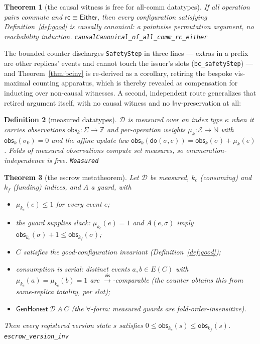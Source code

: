 \documentclass[11pt]{article}
\newtheorem{theorem}{Theorem}[section]
\newtheorem{definition}[theorem]{Definition}
\newcommand{\vis}{\xrightarrow{\mathsf{vis}}}
\newcommand{\rcrel}{\mathsf{rc}}                 %
\newcommand{\Sinit}{\sigma_0}
\newcommand{\lean}[1]{\texttt{#1}}
\newcommand{\M}[1]{\mathcal{#1}}
\newcommand{\st}{\sigma}
\newcommand{\dodo}{\mathsf{do}}
\newcommand{\Inv}{\mathsf{Inv}}
\newcommand{\Either}{\textsf{Either}}
\begin{document}
\begin{theorem}[the causal witness is free for all-comm datatypes]
\label{thm:ccfree}
If all operation pairs commute and $\rcrel \equiv \Either$, then every configuration
satisfying Definition~\ref{def:good} is causally canonical: a pointwise permutation
argument, no reachability induction.
\hfill\lean{causalCanonical\_of\_all\_comm\_rc\_either}
\end{theorem}

The bounded counter discharges \lean{SafetyStep}
in three lines --- extras in a prefix are other replicas' events and
cannot touch the issuer's slots (\lean{bc\_safetyStep}) --- and
Theorem~\ref{thm:bcinv} is
re-derived as a corollary, retiring the bespoke vis-maximal counting
apparatus, which is thereby revealed as compensation for inducting over
non-causal witnesses. A second, independent route generalizes that
retired argument itself, with no causal witness and no
$\Inv$-preservation at all:

\begin{definition}[measured datatypes]
\label{def:measured}
$\M{D}$ is \emph{measured} over an index type $\kappa$ when it carries observations
$\mathsf{obs}_k : \Sigma \to \mathbb{Z}$ and per-operation weights
$\mu_k : \M{E} \to \mathbb{N}$ with $\mathsf{obs}_k(\Sinit) = 0$ and the affine update
law $\mathsf{obs}_k(\dodo(\st, e)) = \mathsf{obs}_k(\st) + \mu_k(e)$. Folds of
measured observations compute set measures, so enumeration-independence is free.
\hfill\lean{Measured}
\end{definition}

\begin{theorem}[the escrow metatheorem]
\label{thm:escrow}
Let $\M{D}$ be measured, $k_c$ (consuming) and $k_f$ (funding) indices, and $A$ a
guard, with
\begin{itemize}[leftmargin=2.2em]
\item[(i)] $\mu_{k_c}(e) \le 1$ for every event $e$;
\item[(ii)] the guard supplies slack: $\mu_{k_c}(e) = 1$ and $A(e, \sigma)$ imply
  $\mathsf{obs}_{k_c}(\sigma) + 1 \le \mathsf{obs}_{k_f}(\sigma)$;
\item[(iii)] $C$ satisfies the good-configuration invariant
  (Definition~\ref{def:good});
\item[(iv)] consumption is serial: distinct events $a, b \in E(C)$ with
  $\mu_{k_c}(a) = \mu_{k_c}(b) = 1$ are $\vis$-comparable (the counter obtains this
  from same-replica totality, per slot);
\item[(v)] $\mathsf{GenHonest}\ \M{D}\ A\ C$ (the $\forall$-form: measured guards are
  fold-order-insensitive).
\end{itemize}
Then every registered version state $s$ satisfies
$0 \le \mathsf{obs}_{k_c}(s) \le \mathsf{obs}_{k_f}(s)$.
\hfill\lean{escrow\_version\_inv}
\end{theorem}
\end{document}
